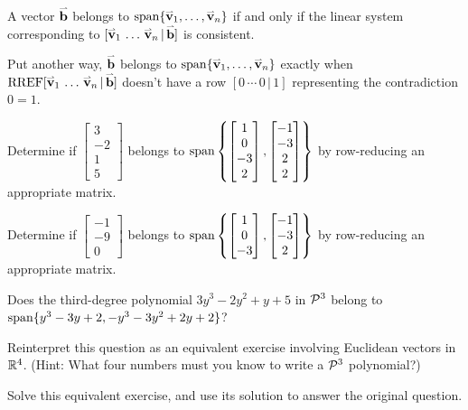 \begin{fact}
  A vector \(\vect b\) belongs to
  \(\vspan\{\vect v_1,\dots,\vect v_n\}\) if and only if
  the linear system corresponding to
  \([\vect v_1\,\dots\,\vect v_n \,|\, \vect b]\)
  is consistent.

  \vspace{1em}

  Put another way, \(\vect b\) belongs to
  \(\vspan\{\vect v_1,\dots,\vect v_n\}\) exactly when
  \(\RREF[\vect v_1\,\dots\,\vect v_n \,|\, \vect b]\)
  doesn't have a row \([0\,\cdots\,0\,|\,1]\)
  representing the contradiction \(0=1\).
\end{fact}

\begin{activity}{10}
  Determine if
  \(\begin{bmatrix}3\\-2\\1 \\ 5\end{bmatrix}\) belongs to
  \(\vspan\left\{\begin{bmatrix}1\\0\\-3 \\ 2\end{bmatrix},
  \begin{bmatrix}-1\\-3\\2 \\ 2\end{bmatrix}\right\}\)
  by row-reducing an appropriate matrix.
\end{activity}

\begin{activity}{5}
  Determine if
  \(\begin{bmatrix}-1\\-9\\0\end{bmatrix}\) belongs to
  \(\vspan\left\{\begin{bmatrix}1\\0\\-3\end{bmatrix},
  \begin{bmatrix}-1\\-3\\2\end{bmatrix}\right\}\)
  by row-reducing an appropriate matrix.
\end{activity}


\begin{activity}{10}
  Does the third-degree polynomial \(3y^3-2y^2+y+5\) in \(\P^3\) belong to
  \(\vspan\{y^3-3y+2,-y^3-3y^2+2y+2\}\)?
  \begin{subactivity}
  	Reinterpret this question as an equivalent exercise involving Euclidean
    vectors in \(\IR^4\). (Hint: What four numbers must you know to write
    a \(\P^3\) polynomial?)
  \end{subactivity}
  \begin{subactivity}
  	Solve this equivalent exercise, and use its solution to answer the original
    question.
  \end{subactivity}
\end{activity}

